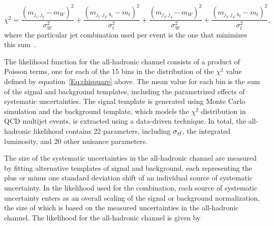 \begin{equation}\label{Eq:chisquare}
  \chi^2 =  \frac{ \left(m_{j_1, j_2} - m_{W}\right)^2}{\sigma_W^2} + \frac{ \left(m_{j_1, j_2, b_1} - m_{t}\right)^2}{\sigma_t^2} + \frac{ \left(m_{j_3, j_4} - m_{W}\right)^2}{\sigma_W^2} + \frac{ \left(m_{j_3, j_4, b_2} - m_{t}\right)^2}{\sigma_t^2},
  \end{equation}
where the particular jet combination used per event is the one that minimizes this sum~\cite{ATLAS-CONF-2011-140}.

The likelihood function for the all-hadronic channel consists of a product of Poisson terms, 
one for each of the 15 bins in the distribution of the $\chi^2$ value defined by equation~\ref{Eq:chisquare} above. 
The mean value for each bin is the sum of the signal and background templates, including the parametrized effects of systematic uncertainties.
The signal template is generated using Monte Carlo simulation and the background template, which models the $\chi^2$ distribution in QCD multijet events, is extracted using a data-driven technique.
In total, the all-hadronic likelihood contains 22 parameters, including $\sigma_{t\bar{t}}$, the integrated luminosity, and 20 other nuisance parameters.

The size of the systematic uncertainties in the all-hadronic channel are measured by fitting alternative templates of signal and background, 
each representing the plus or minus one standard deviation shift of an individual source of systematic uncertainty.
In the likelihood used for the combination, each source of systematic uncertainty enters as an overall scaling of the signal or background normalization,
the size of which is based on the measured uncertainties in the all-hadronic channel.
The likelihood for the all-hadronic channel is given by

